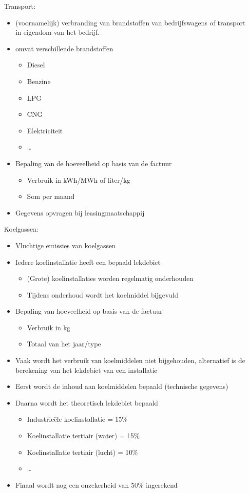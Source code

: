 \documentclass[12pt]{article}
\begin{document}
Transport:\begin{itemize}
    \item (voornamelijk) verbranding van brandstoffen van bedrijfswagens of transport in
    eigendom van het bedrijf.
    \item omvat verschillende brandstoffen\begin{itemize}
        \item Diesel
        \item Benzine 
        \item LPG 
        \item CNG 
        \item Elektriciteit
        \item \dots
    \end{itemize}
    \item Bepaling van de hoeveelheid op basis van de factuur\begin{itemize}
        \item Verbruik in kWh/MWh of liter/kg 
        \item Som per maand
    \end{itemize}
    \item Gegevens opvragen bij leasingmaatschappij
\end{itemize}
Koelgassen:\begin{itemize}
    \item Vluchtige emissies van koelgassen
    \item Iedere koelinstallatie heeft een bepaald lekdebiet\begin{itemize}
        \item (Grote) koelinstallaties worden regelmatig onderhouden
        \item Tijdens onderhoud wordt het koelmiddel bijgevuld
    \end{itemize}
    \item Bepaling van hoeveelheid op basis van de factuur\begin{itemize}
        \item Verbruik in kg 
        \item Totaal van het jaar/type
    \end{itemize}
    \item Vaak wordt het verbruik van koelmiddelen niet bijgehouden, alternatief is de berekening van het lekdebiet van een installatie
    \item Eerst wordt de inhoud aan koelmiddelen bepaald (technische gegevens) 
    \item Daarna wordt het theoretisch lekdebiet bepaald\begin{itemize}
        \item Industrieële koelinstallatie = 15\%
        \item Koelinstallatie tertiair (water) = 15\%
        \item Koelinstallatie tertiair (lucht) = 10\%
        \item \dots
    \end{itemize}
    \item Finaal wordt nog een onzekerheid van 50\% ingerekend
\end{itemize}
\end{document}
